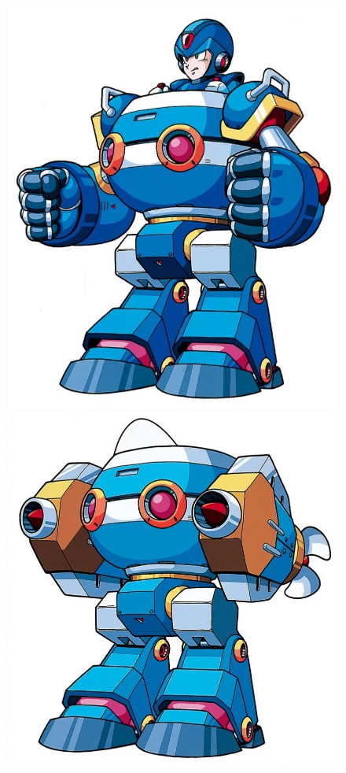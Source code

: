 \begin{itemize}
	\begin{figure}[htp]
		\centering
		\includegraphics[height=\portraitsize]{figures/X3/weapons/Chimera.png}
		\includegraphics[height=\portraitsize]{figures/X3/weapons/Frog.png}\\

\end{figure}
\end{itemize}
